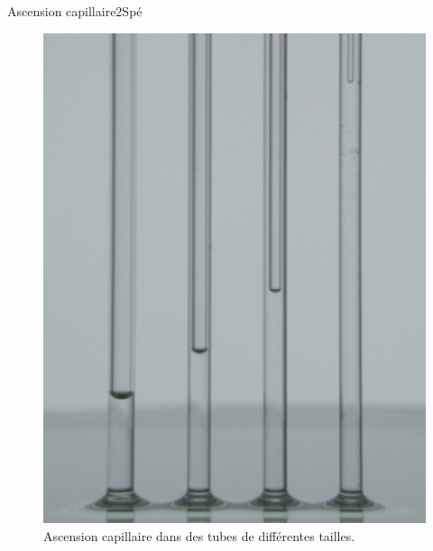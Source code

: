 \begin{exercise}{Ascension capillaire}{2}{Spé}
\begin{questions}
\begin{EnvUplevel}
\begin{multicols}{2}
\begin{figure}[H]
    \centering
    \includegraphics[width=\linewidth]{mecaflu/jurin1.png}
    \vspace{-1em}
    \caption{Ascension capillaire dans des tubes de différentes tailles.}\label{fig:jur1}
\end{figure}
\begin{figure}[H]
    \centering

\end{figure}
\end{multicols}
\end{EnvUplevel}
\end{questions}
\end{exercise}
